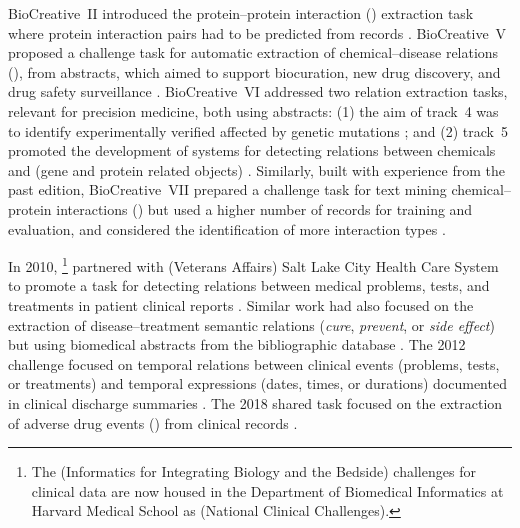 BioCreative~II introduced the protein--protein interaction () extraction task where protein interaction pairs had to be predicted from  records \parencite{krallinger2007a,krallinger2008b}.
BioCreative~V proposed a challenge task for automatic extraction of chemical--disease relations (), from  abstracts, which aimed to support biocuration, new drug discovery, and drug safety surveillance \parencite{wei2015a,wei2016a}.
BioCreative~VI addressed two relation extraction tasks, relevant for precision medicine, both using  abstracts: (1) the aim of track~4 was to identify experimentally verified  affected by genetic mutations \parencite{dogan2017a,dogan2019a}; and (2) track~5 promoted the development of systems for detecting relations between chemicals and  (gene and protein related objects) \parencite{krallinger2017a}.
Similarly, built with experience from the past edition, BioCreative~VII prepared a challenge task for text mining chemical--protein interactions () but used a higher number of  records for training and evaluation, and considered the identification of more interaction types \parencite{miranda2021a}.

In 2010, \footnote{The  (Informatics for Integrating Biology and the Bedside)  challenges for clinical data are now housed in the Department of Biomedical Informatics at Harvard Medical School as  (National  Clinical Challenges).} partnered with  (Veterans Affairs) Salt Lake City Health Care System to promote a task for detecting relations between medical problems, tests, and treatments in patient clinical reports \parencite{uzuner2011a}.
Similar work had also focused on the extraction of disease--treatment semantic relations (\textit{cure}, \textit{prevent}, or \textit{side effect}) but using biomedical abstracts from the  bibliographic database \parencite{rosario2004a,frunza2010a}.
The 2012  challenge focused on temporal relations between clinical events (problems, tests, or treatments) and temporal expressions (dates, times, or durations) documented in clinical discharge summaries \parencite{sun2013b}.
The 2018  shared task focused on the extraction of adverse drug events () from clinical records \parencite{henry2019a}.

